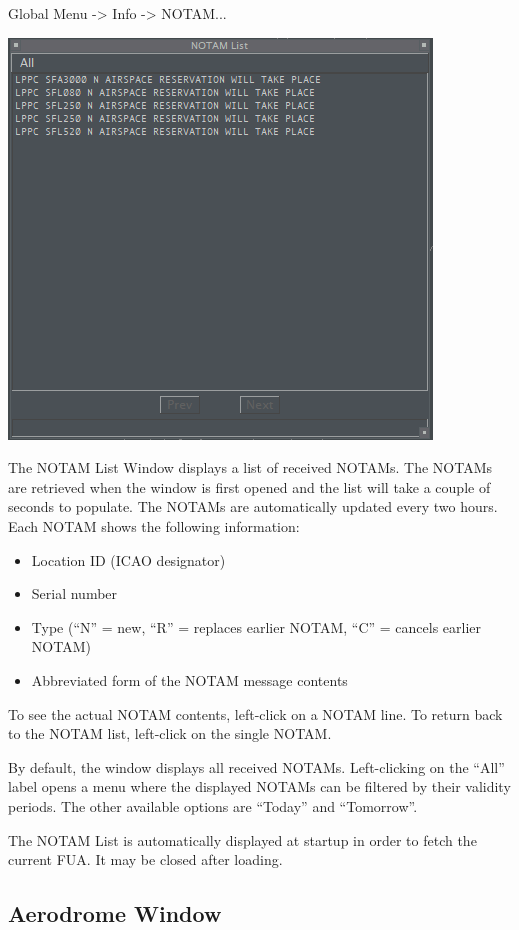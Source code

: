 \documentclass[11pt,a4paper,oldfontcommands]{memoir}
\begin{document}
Global Menu -> Info -> NOTAM...

\includegraphics{img/notamlist.png}

The NOTAM List Window displays a list of received NOTAMs. The NOTAMs are retrieved when the window is first opened and the list will take a couple of seconds to populate. The NOTAMs are automatically updated every two hours. Each NOTAM shows the following information:

\begin{itemize}
    \item Location ID (ICAO designator)
    \item Serial number
    \item Type (“N” = new, “R” = replaces earlier NOTAM, “C” = cancels earlier NOTAM)
    \item Abbreviated form of the NOTAM message contents
\end{itemize}

To see the actual NOTAM contents, left-click on a NOTAM line. To return back to the NOTAM list, left-click on the single NOTAM.

By default, the window displays all received NOTAMs. Left-clicking on the “All” label opens a menu where the displayed NOTAMs can be filtered by their validity periods. The other available options are “Today” and “Tomorrow”.

The NOTAM List is automatically displayed at startup in order to fetch the current FUA. It may be closed after loading.

\subsection{Aerodrome Window}
\label{win:adw}
\end{document}
